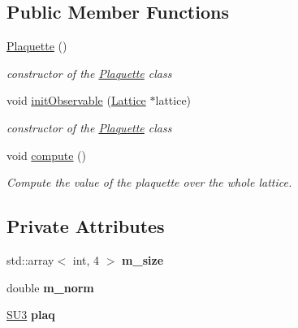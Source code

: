 \subsection*{Public Member Functions}
\begin{DoxyCompactItemize}
\item 
\hyperlink{classPlaquette_aa40297bb06bbc205a32c65a4028ad1db}{Plaquette} ()\hypertarget{classPlaquette_aa40297bb06bbc205a32c65a4028ad1db}{}\label{classPlaquette_aa40297bb06bbc205a32c65a4028ad1db}

\begin{DoxyCompactList}\small\item\em constructor of the \hyperlink{classPlaquette}{Plaquette} class \end{DoxyCompactList}\item 
void \hyperlink{classPlaquette_a736815cd93211ae6762d26f3694a88d5}{init\+Observable} (\hyperlink{classLattice}{Lattice} $\ast$lattice)\hypertarget{classPlaquette_a736815cd93211ae6762d26f3694a88d5}{}\label{classPlaquette_a736815cd93211ae6762d26f3694a88d5}

\begin{DoxyCompactList}\small\item\em constructor of the \hyperlink{classPlaquette}{Plaquette} class \end{DoxyCompactList}\item 
void \hyperlink{classPlaquette_a4f5cd3222dc5ecec563ff873507493ea}{compute} ()\hypertarget{classPlaquette_a4f5cd3222dc5ecec563ff873507493ea}{}\label{classPlaquette_a4f5cd3222dc5ecec563ff873507493ea}

\begin{DoxyCompactList}\small\item\em Compute the value of the plaquette over the whole lattice. \end{DoxyCompactList}\end{DoxyCompactItemize}
\subsection*{Private Attributes}
\begin{DoxyCompactItemize}
\item 
std\+::array$<$ int, 4 $>$ {\bfseries m\+\_\+size}\hypertarget{classPlaquette_aef320da834a652eef5dc9fdaf9feb898}{}\label{classPlaquette_aef320da834a652eef5dc9fdaf9feb898}

\item 
double {\bfseries m\+\_\+norm}\hypertarget{classPlaquette_a01a530c15a05f0d0c0db0ee96df7f943}{}\label{classPlaquette_a01a530c15a05f0d0c0db0ee96df7f943}

\item 
\hyperlink{structSU3}{S\+U3} {\bfseries plaq}\hypertarget{classPlaquette_ada0642da7642a9d271681985b93a4070}{}\label{classPlaquette_ada0642da7642a9d271681985b93a4070}

\end{DoxyCompactItemize}
